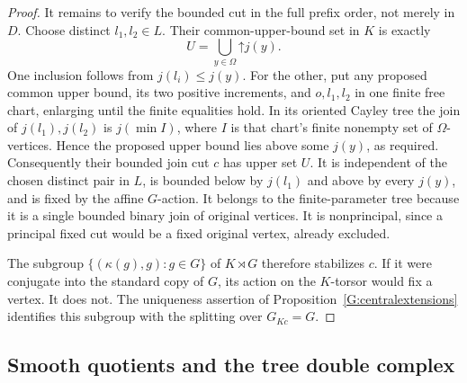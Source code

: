 \begin{proof}
It remains to verify the bounded cut in the full prefix order,
not merely in $D$. Choose distinct $l_1,l_2\in L$. Their
common-upper-bound set in $K$ is exactly
\[
 U=\bigcup_{y\in\Omega}\mathord\uparrow j(y).
\]
One inclusion follows from $j(l_i)\le j(y)$. For the other,
put any proposed common upper bound, its two positive increments,
and $o,l_1,l_2$ in one finite free chart, enlarging until the
finite equalities hold. In its oriented Cayley tree the join
of $j(l_1),j(l_2)$ is $j(\min I)$, where $I$ is that chart's
finite nonempty set of $\Omega$-vertices. Hence the proposed
upper bound lies above some $j(y)$, as required.
Consequently their bounded join cut $c$ has upper set $U$.
It is independent of the chosen distinct pair in $L$, is
bounded below by $j(l_1)$ and above by every $j(y)$, and is
fixed by the affine $G$-action. It belongs to the finite-parameter
tree because it is a single bounded binary join of original
vertices. It is nonprincipal, since a principal fixed cut would
be a fixed original vertex, already excluded.

The subgroup $\{(\kappa(g),g):g\in G\}$ of $K\rtimes G$
therefore stabilizes $c$. If it were conjugate into the
standard copy of $G$, its action on the $K$-torsor would fix
a vertex. It does not. The uniqueness assertion of
Proposition~\ref{G:centralextensions} identifies this subgroup
with the splitting over $G_{Kc}=G$.
\end{proof}


\subsection{Smooth quotients and the tree double complex}

